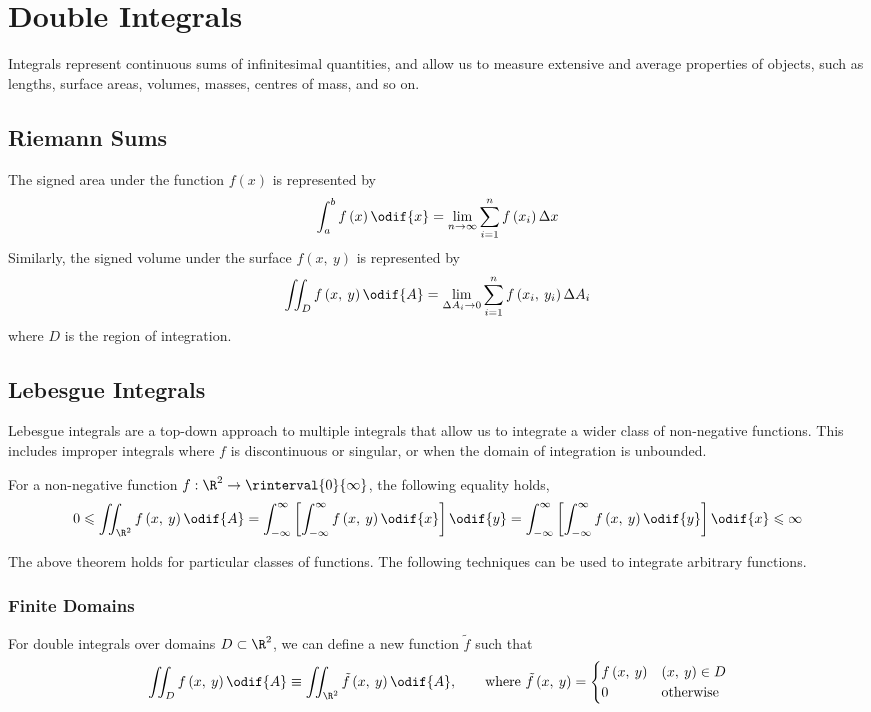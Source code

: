 \documentclass{article}
\begin{document}
\section{Double Integrals}
Integrals represent continuous sums of infinitesimal quantities, and
allow us to measure extensive and average properties of objects, such
as lengths, surface areas, volumes, masses, centres of mass, and so on.
\subsection{Riemann Sums}
The signed area under the function \(f\left( x \right)\) is represented
by
\begin{equation*}
    \int_a^b f\left( x \right) \odif{x} = \lim_{n \to \infty} \sum_{i = 1}^n f\left( x_i \right) \Delta x
\end{equation*}
Similarly, the signed volume under the surface \(f\left( x,\: y \right)\)
is represented by
\begin{equation*}
    \iint_D f\left( x,\: y \right) \odif{A} = \lim_{\Delta A_i \to 0} \sum_{i = 1}^n f\left( x_i,\: y_i \right) \Delta A_i
\end{equation*}
where \(D\) is the region of integration.
\subsection{Lebesgue Integrals}
Lebesgue integrals are a top-down approach to multiple integrals that
allow us to integrate a wider class of non-negative functions. This
includes improper integrals where \(f\) is discontinuous or singular,
or when the domain of integration is unbounded.
\begin{theorem}
    For a non-negative function \(f : \R^2 \to \rinterval{0}{\infty}\),
    the following equality holds,
    \begin{equation*}
        0 \leqslant \iint_{\R^2} f\left( x,\: y \right) \odif{A} = \int_{-\infty}^\infty \left[ \int_{-\infty}^\infty f\left( x,\: y \right) \odif{x} \right] \odif{y} = \int_{-\infty}^\infty \left[ \int_{-\infty}^\infty f\left( x,\: y \right) \odif{y} \right] \odif{x} \leqslant \infty
    \end{equation*}
\end{theorem}
The above theorem holds for particular classes of functions. The
following techniques can be used to integrate arbitrary functions.
\subsubsection{Finite Domains}
For double integrals over domains \(D \subset \R^2\), we can define a
new function \(\tilde{f}\) such that
\begin{equation*}
    \iint_D f\left( x,\: y \right) \odif{A} \equiv \iint_{\R^2} \tilde{f}\left( x,\: y \right) \odif{A}, \qquad \text{where } \tilde{f}\left( x,\: y \right) =
    \begin{cases}
        f\left( x,\: y \right) & \left( x,\: y \right) \in D \\
        0                      & \text{otherwise}
    \end{cases}
\end{equation*}
\end{document}
